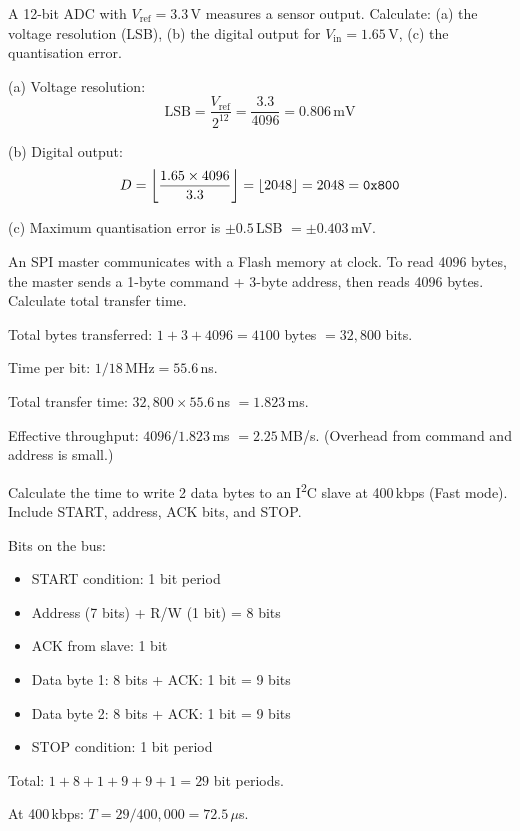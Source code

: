 \begin{example}
A 12-bit ADC with $V_{\text{ref}} = 3.3\,$V measures a sensor output. Calculate: (a) the voltage resolution (LSB), (b) the digital output for $V_{\text{in}} = 1.65\,$V, (c) the quantisation error.

\begin{solution}
(a) Voltage resolution:
\[
  \text{LSB} = \frac{V_{\text{ref}}}{2^{12}} = \frac{3.3}{4096} = 0.806\,\text{mV}
\]

(b) Digital output:
\[
  D = \left\lfloor \frac{1.65 \times 4096}{3.3} \right\rfloor = \left\lfloor 2048 \right\rfloor = 2048 = \texttt{0x800}
\]

(c) Maximum quantisation error is $\pm 0.5\,$LSB $ = \pm 0.403\,$mV.
\end{solution}
\end{example}

\begin{example}
An SPI master communicates with a Flash memory at  clock. To read 4096 bytes, the master sends a 1-byte command + 3-byte address, then reads 4096 bytes. Calculate total transfer time.

\begin{solution}
Total bytes transferred: $1 + 3 + 4096 = 4100$ bytes $= 32{,}800$ bits.

Time per bit: $1/18\,\text{MHz} = 55.6\,$ns.

Total transfer time: $32{,}800 \times 55.6\,$ns $= 1.823\,$ms.

Effective throughput: $4096 / 1.823\,$ms $= 2.25\,$MB/s. (Overhead from command and address is small.)
\end{solution}
\end{example}

\begin{example}
Calculate the time to write 2 data bytes to an I\textsuperscript{2}C slave at 400\,kbps (Fast mode). Include START, address, ACK bits, and STOP.

\begin{solution}
Bits on the bus:
\begin{itemize}[nosep]
  \item START condition: 1 bit period
  \item Address (7 bits) + R/W (1 bit) = 8 bits
  \item ACK from slave: 1 bit
  \item Data byte 1: 8 bits + ACK: 1 bit = 9 bits
  \item Data byte 2: 8 bits + ACK: 1 bit = 9 bits
  \item STOP condition: 1 bit period
\end{itemize}
Total: $1 + 8 + 1 + 9 + 9 + 1 = 29$ bit periods.

At 400\,kbps: $T = 29 / 400{,}000 = 72.5\,\mu$s.
\end{solution}
\end{example}

